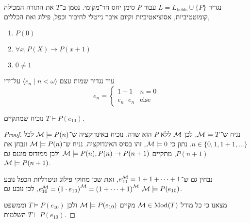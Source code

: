 \question[4]{}
נגדיר $L = L_{\text{fields}} \cup \{ P \}$ עבור $P$ סימן יחס חד־מקומי.
נסמן ב־$T$ את התורה המכילה קומוטטיביות, אסוציאטיביות וקיום איבר נייטלי לחיבור וכפל, פילוג ואת הכללים,
\begin{enumerate}
	\item $P(0)$
	\item $\forall x, P(X) \rightarrow P(x + 1)$
	\item $0 \ne 1$
\end{enumerate}
עוד נגדיר שמות עצם $\langle e_n \mid n < \omega \rangle$ על־ידי
\[
	e_n
	= \begin{cases}
		1 + 1 & n = 0 \\
		e_n \cdot e_n & \text{else}
	\end{cases}
\]

\subquestion{}
נוכיח שמתקיים $T \vdash P(e_{10})$.
\begin{proof}
	נניח ש־$\mathcal{M} \models T$, לכן $\mathcal{M}$ ללא $P$ הוא שדה.
	נוכיח באינדוקציה ש־$\mathcal{M} \models P(n)$ לכל $n \in \{0, 1, 1 + 1, \dots \}$.
	נתון כי $\mathcal{M} \models 0$, זהו בסיס האינדוקציה.
	נניח ש־$\mathcal{M} \models P(n)$ ונבחן את $P(n + 1)$, מתקיים $\mathcal{M} \models P(n), P(n) \rightarrow P(n + 1)$ ולכן ממודוס־פוננס גם $\mathcal{M} \models P(n + 1)$.

	נבחין גם ש־$e_{10}^{\mathcal{M}} = 1 + 1 + \cdots + 1$, זאת שכן מחוקי פילוג וניטרליות הכפל נובע $e_{10}^{\mathcal{M}} = {(1 \cdot e_{10})}^{\mathcal{M}} = {(1 + \cdots + 1)}^{\mathcal{M}}$, לכן נובע גם $\mathcal{M} \models P(e_{10})$.
	
	מצאנו כי כל מודל $\mathcal{M} \in \operatorname{Mod}(T)$ מקיים $\mathcal{M} \models P(e_{10})$ ולכן $T \models P(e_{10})$ וממשפט השלמות $T \vdash P(e_{10})$.
\end{proof}


